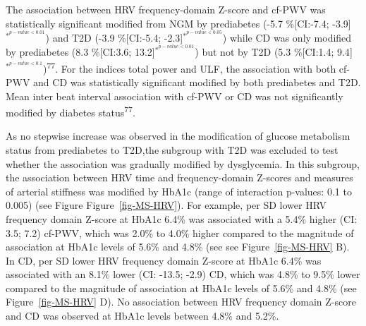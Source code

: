 \documentclass[
  letterpaper,
  headsepline=true,
  open=any]{scrbook}
\begin{document}
The association between HRV frequency-domain Z-score and cf-PWV was
statistically significant modified from NGM by prediabetes (-5.7
\%{[}CI:-7.4; -3.9{]}\(^{*^{p-value< 0.01}}\)) and T2D (-3.9
\%{[}CI:-5.4; -2.3{]}\(^{*^{p-value< 0.05}}\)) while CD was only
modified by prediabetes (8.3 \%{[}CI:3.6;
13.2{]}\(^{*^{p-value< 0.01}}\)) but not by T2D (5.3 \%{[}CI:1.4;
9.4{]}\(^{*^{p-value< 0.1}}\))\textsuperscript{77}. For the indices
total power and ULF, the association with both cf-PWV and CD was
statistically significant modified by both prediabetes and T2D. Mean
inter beat interval association with cf-PWV or CD was not significantly
modified by diabetes status\textsuperscript{77}.

As no stepwise increase was observed in the modification of glucose
metabolism status from prediabetes to T2D,the subgroup with T2D was
excluded to test whether the association was gradually modified by
dysglycemia. In this subgroup, the association between HRV time and
frequency-domain Z-scores and measures of arterial stiffness was
modified by HbA1c (range of interaction p-values: 0.1 to 0.005) (see
Figure Figure~\ref{fig-MS-HRV}). For example, per SD lower HRV frequency
domain Z-score at HbA1c 6.4\% was associated with a 5.4\% higher (CI:
3.5; 7.2) cf-PWV, which was 2.0\% to 4.0\% higher compared to the
magnitude of association at HbA1c levels of 5.6\% and 4.8\% (see see
Figure~\ref{fig-MS-HRV} B). In CD, per SD lower HRV frequency domain
Z-score at HbA1c 6.4\% was associated with an 8.1\% lower (CI: -13.5;
-2.9) CD, which was 4.8\% to 9.5\% lower compared to the magnitude of
association at HbA1c levels of 5.6\% and 4.8\% (see
Figure~\ref{fig-MS-HRV} D). No association between HRV frequency domain
Z-score and CD was observed at HbA1c levels between 4.8\% and 5.2\%.

\end{document}
